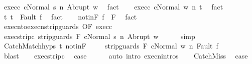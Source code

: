 \begin{isabellebody}
\ exec{\isacharunderscore}c{}{\isacharcolon}\ {\isachardoublequoteopen}{\isasymGamma}{\isasymturnstile}{\isasymlangle}c{}{\isacharcomma}Normal\ s{\isasymrangle}\ {\isacharequal}n{\isasymRightarrow}\ Abrupt\ w{\isachardoublequoteclose}\ \isamarkupfalse%
\ fact\isanewline
\ \ \isamarkupfalse%
\ exec{\isacharunderscore}c{}{\isacharcolon}\ {\isachardoublequoteopen}{\isasymGamma}{\isasymturnstile}{\isasymlangle}c{}{\isacharcomma}Normal\ w{\isasymrangle}\ {\isacharequal}n{\isasymRightarrow}\ t{\isachardoublequoteclose}\ \isamarkupfalse%
\ fact\isanewline
\ \ \isamarkupfalse%
\ t{\isacharcolon}\ {\isachardoublequoteopen}t\ {\isacharequal}\ Fault\ f{\isachardoublequoteclose}\ \isamarkupfalse%
\ fact\isanewline
\ \ \isamarkupfalse%
\ notinF{\isacharcolon}\ {\isachardoublequoteopen}f\ {\isasymnotin}\ F{\isachardoublequoteclose}\ \isamarkupfalse%
\ fact\isanewline
\ \ \isamarkupfalse%
\ execn{\isacharunderscore}to{\isacharunderscore}execn{\isacharunderscore}strip{\isacharunderscore}guards\ {\isacharbrackleft}OF\ exec{\isacharunderscore}c{}{\isacharbrackright}\isanewline
\ \ \isamarkupfalse%
\ exec{\isacharunderscore}strip{\isacharunderscore}c{}{\isacharcolon}\ {\isachardoublequoteopen}{\isasymGamma}{\isasymturnstile}{\isasymlangle}strip{\isacharunderscore}guards\ F\ c{}{\isacharcomma}Normal\ s{\isasymrangle}\ {\isacharequal}n{\isasymRightarrow}\ Abrupt\ w{\isachardoublequoteclose}\isanewline
\ \ \ \ \isamarkupfalse%
\ simp\isanewline
\ \ \isamarkupfalse%
\ CatchMatch{\isachardot}hyps\ t\ notinF\ \isanewline
\ \ \isamarkupfalse%
\ {\isachardoublequoteopen}{\isasymGamma}{\isasymturnstile}{\isasymlangle}strip{\isacharunderscore}guards\ F\ c{}{\isacharcomma}Normal\ w{\isasymrangle}\ {\isacharequal}n{\isasymRightarrow}\ Fault\ f{\isachardoublequoteclose}\ \isanewline
\ \ \ \ \isamarkupfalse%
\ blast\isanewline
\ \ \isamarkupfalse%
\ exec{\isacharunderscore}strip{\isacharunderscore}c{}\ \isamarkupfalse%
\ {\isacharquery}case\isanewline
\ \ \ \ \isamarkupfalse%
\ {\isacharparenleft}auto\ intro{\isacharcolon}\ execn{\isachardot}intros{\isacharparenright}\isanewline
{}\isamarkupfalse%
\isanewline
\ \ \isamarkupfalse%
\ CatchMiss\ \isamarkupfalse%
\ {\isacharquery}case\ \isamarkupfalse%

\end{isabellebody}
